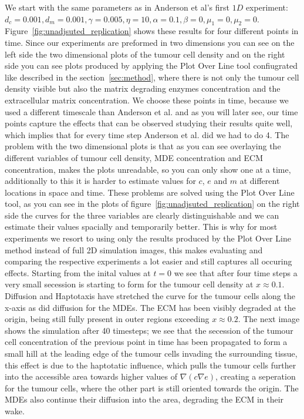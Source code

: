 We start with the same parameters as in Anderson et al's first $1D$ experiment: $d_c = 0.001, d_m = 0.001, \gamma = 0.005, \eta = 10, \alpha = 0.1, \beta = 0, \mu_1 = 0, \mu_2 = 0$. Figure~\ref{fig:unadjsuted_replication} shows these results for four different points in time. Since our experiments are preformed in two dimensions you can see on the left side the two dimensional plots of the tumour cell density and on the right side you can see plots produced by applying the Plot Over Line tool confiugrated like described in the section~\ref{sec:method}, where there is not only the tumour cell density visible but also the matrix degrading enzymes concentration and the extracellular matrix concentration. We choose these points in time, because we used a different timescale than Anderson et al. and as you will later see, our time points capture the effects that can be observed studying their results quite well, which implies that for every time step Anderson et al. did we had to do 4. The problem with the two dimensional plots is that as you can see overlaying the different variables of tumour cell density, MDE concentration and ECM concentration, makes the plots unreadable, so you can only show one at a time, additionally to this it is harder to estimate values for $c$, $e$ and $m$ at different locations in space and time. These problems are solved using the Plot Over Line tool, as you can see in the plots of figure~\ref{fig:unadjsuted_replication} on the right side the curves for the three variables are clearly distinguishable and we can estimate their values spacially and temporarily better. This is why for most experiments we resort to using only the results produced by the Plot Over Line method instead of full 2D simulation images, this makes evaluating and comparing the respective experiments a lot easier and still captures all occuring effects. \newline
Starting from the inital values at $t=0$ we see that after four time steps a very small secession is starting to form for the tumour cell density at $x\approx 0.1$. Diffusion and Haptotaxis have stretched the curve for the tumour cells along the x-axis as did diffusion for the MDEs. The ECM has  been visibly degraded at the origin, being still fully present in outer regions exceeding $x\approx 0.2$.\newline
The next image shows the simulation after 40 timesteps; we see that the secession of the tumour cell concentration of the previous point in time has been propagated to form a small hill at the leading edge of the tumour cells invading the surrounding tissue, this effect is due to the haptotatic influence, which pulls the tumour cells further into the accessible area towards higher values of $\nabla (c \nabla e)$, creating a seperation for the tumour cells, where the other part is still oriented towards the origin. The MDEs also continue their diffusion into the area, degrading the ECM in their wake.\newline 
